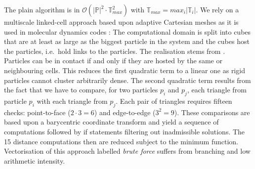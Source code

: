 %
%
The plain algorithm is in $\mathcal{O}(| \mathbb{P} |^2 \cdot
\mathbb{T}_{max}^2 )$ with $\mathbb{T}_{max} = max _i | \mathbb{T}_i | $.
We rely on a multiscale linked-cell approach based upon adaptive Cartesian
meshes as it is used in molecular dynamics codes
\cite{Griebel.Knapek.Zumbusch:2007}:
The computational domain is split into cubes that are at least as large as
the biggest particle in the system and the cubes host the particles, i.e.~hold
links to the particles.
The realisation stems from \cite{Weinzierl2016}.
Particles can be in contact if and only if they are hosted by the same or
neighbouring cells.
This reduces the first quadratic term to a linear one as
rigid particles cannot cluster arbitrarily dense.
The second quadratic term results from the fact that we have to compare, for two
particles $p_i$ and $p_j$, each triangle from particle $p_i$ with each triangle
from $p_j$.
Each pair of triangles requires fifteen checks: point-to-face
($2 \cdot 3=6$) and edge-to-edge ($3^2=9$).
These comparisons are based upon a barycentric coordinate transform and yield
a sequence of computations followed by if statements filtering out
inadmissible solutions.
The 15 distance computations then are reduced subject to the minimum function.
Vectorisation of this approach labelled {\em brute force} suffers from branching
and low arithmetic intensity.

